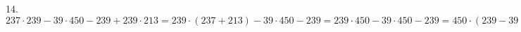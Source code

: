 14. $237\cdot239-39\cdot450-239+239\cdot213=239\cdot(237+213)-39\cdot450-239=239\cdot450-39\cdot450-239=450\cdot(239-39)-239=450\cdot200-239=90000-239=89761.$\\
